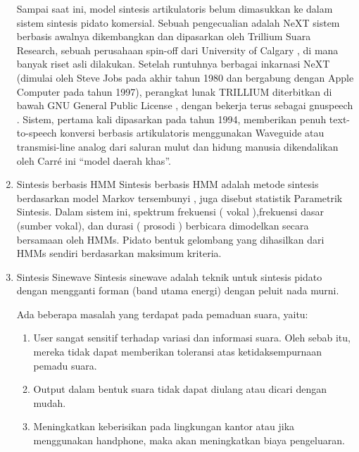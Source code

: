 \begin{enumerate}
Sampai saat ini, model sintesis artikulatoris belum dimasukkan ke dalam sistem sintesis pidato komersial. Sebuah pengecualian adalah NeXT sistem berbasis awalnya dikembangkan dan dipasarkan oleh Trillium Suara Research, sebuah perusahaan spin-off dari University of Calgary , di mana banyak riset asli dilakukan. Setelah runtuhnya berbagai inkarnasi NeXT (dimulai oleh Steve Jobs pada akhir tahun 1980 dan bergabung dengan Apple Computer pada tahun 1997), perangkat lunak TRILLIUM diterbitkan di bawah GNU General Public License , dengan bekerja terus sebagai gnuspeech . Sistem, pertama kali dipasarkan pada tahun 1994, memberikan penuh text-to-speech konversi berbasis artikulatoris menggunakan Waveguide atau transmisi-line analog dari saluran mulut dan hidung manusia dikendalikan oleh Carré ini “model daerah khas”.
\item Sintesis berbasis HMM
Sintesis berbasis HMM  adalah metode sintesis berdasarkan model Markov tersembunyi , juga disebut statistik Parametrik Sintesis. Dalam sistem ini, spektrum frekuensi ( vokal ),frekuensi dasar (sumber vokal), dan durasi ( prosodi ) berbicara dimodelkan secara bersamaan oleh HMMs. Pidato bentuk gelombang yang dihasilkan dari HMMs sendiri berdasarkan maksimum kriteria.
\item Sintesis Sinewave
Sintesis sinewave adalah teknik untuk sintesis pidato dengan mengganti forman (band utama energi) dengan peluit nada murni.

Ada beberapa masalah yang terdapat pada pemaduan suara, yaitu:
\begin{enumerate}
\item User sangat sensitif terhadap variasi dan informasi suara. Oleh sebab itu, mereka tidak dapat memberikan toleransi atas ketidaksempurnaan pemadu suara.
\item Output dalam bentuk suara tidak dapat diulang atau dicari dengan mudah.
\item Meningkatkan keberisikan pada lingkungan kantor atau jika menggunakan handphone, maka akan meningkatkan biaya pengeluaran.
\end{enumerate}
\end{enumerate}
